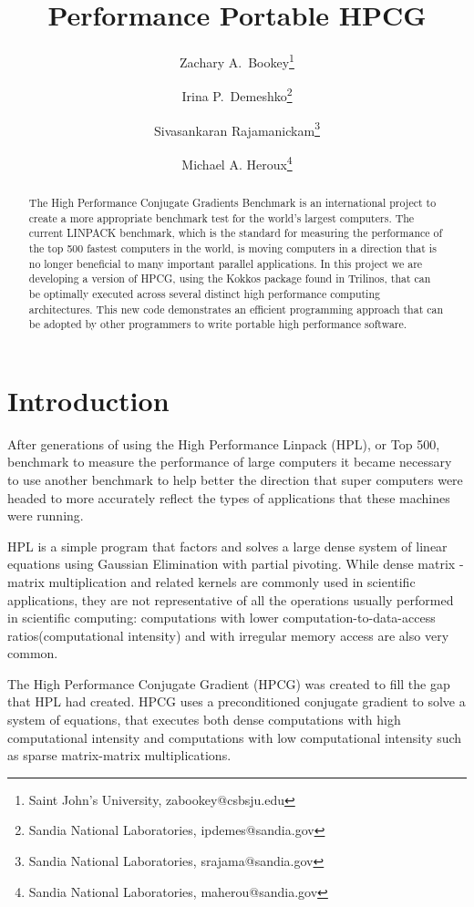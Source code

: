 \documentclass{ccr15}
\title{Performance Portable HPCG}
\author{Zachary A.\ Bookey\thanks{Saint John's University, zabookey@csbsju.edu} \and Irina P.\ Demeshko\thanks{Sandia National Laboratories,
ipdemes@sandia.gov} \and Sivasankaran Rajamanickam\thanks{Sandia National Laboratories, srajama@sandia.gov}\and Michael A. Heroux\thanks{Sandia National Laboratories, maherou@sandia.gov}}
\begin{document}
\maketitle
\begin{abstract}
The High Performance Conjugate Gradients Benchmark is an international project to create a
more appropriate benchmark test for the world's largest computers. The current LINPACK benchmark,
which is the standard for measuring the performance of the top 500 fastest computers in the
world, is moving computers in a direction that is no longer beneficial to many important
parallel applications. In this project we are developing a version of HPCG, using the Kokkos
package found in Trilinos, that can be optimally executed across several distinct high
performance computing architectures. 
This new code demonstrates an efficient programming
approach that can be adopted by other programmers to write portable high performance software.
\end{abstract}

\section{Introduction}

After generations of using the High Performance Linpack (HPL), or Top 500, benchmark \cite{ZAB:Top500} to measure the
performance of large computers it became necessary to use another benchmark to help better the
direction that super computers were headed to more accurately reflect the types of applications
that these machines were running.

HPL is a simple program that factors and solves a large dense system of linear equations using
Gaussian Elimination with partial pivoting.
While dense matrix - matrix multiplication and related kernels are commonly used in scientific applications,
they are not representative of all the operations usually performed in scientific computing:
computations with lower computation-to-data-access ratios(computational intensity) and with
irregular memory access are also very common.

The High Performance Conjugate Gradient (HPCG)\cite{ZAB:TechHPCG}\cite{ZAB:TechHPCG2} was created to fill the gap that HPL had created.
HPCG uses a preconditioned conjugate gradient to solve a system of equations, that executes both
dense computations with high computational intensity and computations with low computational intensity such as sparse matrix-matrix multiplications.
\end{document}
